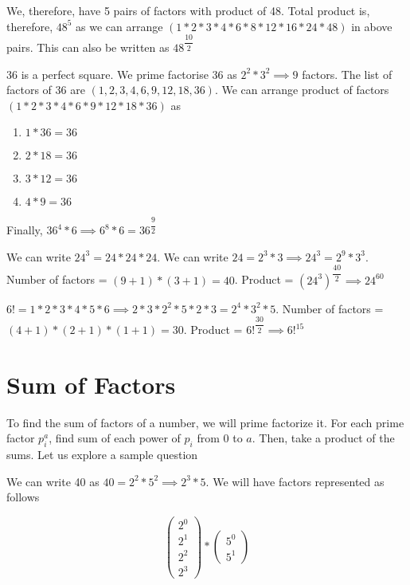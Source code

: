 We, therefore, have 5 pairs of factors with product of 48. Total product is, therefore, $48^5$ as we can arrange $(1 * 2 * 3 * 4 * 6 * 8 * 12 * 16 * 24 * 48)$ in above pairs. This can also be written as $48^{\dfrac{10}{2}}$



36 is a perfect square. We prime factorise 36 as $2^2 * 3^2 \implies 9$ factors. The list of factors of 36 are $(1,2,3,4,6,9,12,18,36)$. We can arrange product of factors $(1 * 2 * 3 * 4 * 6 * 9 * 12 * 18 * 36)$ as
\begin{enumerate}
    \item $1    *   36 = 36$
    \item $2    *   18 = 36$
    \item $3    *   12 = 36$
    \item $4    *   9 = 36$
\end{enumerate}

Finally, $36^4 * 6 \implies 6^8 * 6 = 36^{\dfrac{9}{2}}$


We can write $24^3 = 24 * 24 * 24$. We can write $24 = 2^3 * 3 \implies 24^3 = 2^9 * 3^3$. Number of factors = $(9+1) * (3+1) = 40$. Product = $( 24^{3} ) ^ {\dfrac{40}{2}} \implies 24^{60}$


$6! = 1 * 2 * 3 * 4 * 5 * 6 \implies 2 * 3 * 2^2 * 5 * 2 * 3 = 2^4 * 3^2 * 5$. Number of factors = $(4+1) * (2+1) * (1+1) = 30$. Product = $6!^{\dfrac{30}{2}} \implies 6!^{15}$

\section{Sum of Factors}
To find the sum of factors of a number, we will prime factorize it. For each prime factor $p_i^a$, find sum of each power of $p_i$ from 0 to $a$. Then, take a product of the sums. Let us explore a sample question


We can write 40 as $40 = 2^2 * 5 ^ 2 \implies 2^3 * 5$. We will have factors represented as follows

$$
\begin{pmatrix}
    2^0 \\
    2^1 \\
    2^2 \\
    2^3
\end{pmatrix}
*
\begin{pmatrix}
    5^0 \\
    5^1
\end{pmatrix}
$$

